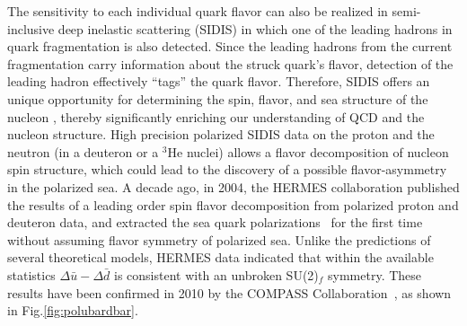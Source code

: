 The sensitivity to each individual quark flavor can also be realized
in semi-inclusive deep inelastic scattering (SIDIS)
in which one of the leading hadrons in quark fragmentation is also detected.
Since the leading hadrons from the current fragmentation 
carry information about
the struck quark's flavor, detection of the leading hadron 
effectively ``tags'' the quark flavor.
Therefore, SIDIS offers an unique opportunity 
for determining the spin, flavor, and sea structure of the nucleon \cite{Frankfurt}, 
thereby significantly enriching 
our understanding of QCD and the nucleon structure. 
High precision polarized SIDIS data on the proton and the neutron 
(in a deuteron or a $^3$He nuclei) allows
a flavor decomposition of nucleon spin structure, which could lead to
the discovery of a possible flavor-asymmetry in the polarized sea.
A decade ago, in 2004, the HERMES collaboration
published the results of a leading order spin flavor decomposition from polarized 
proton and deuteron data, and extracted the sea quark 
polarizations~\cite{Airapetian:2004zf}  for the first time without assuming  flavor symmetry of polarized sea. Unlike 
the predictions of several theoretical models,
HERMES data indicated that within the available statistics
$\Delta \bar{u}- \Delta \bar{d}$ is consistent
with an unbroken SU(2)$_f$ symmetry.  These results have been confirmed in 2010 by the COMPASS Collaboration~\cite{Alekseev:2010ub},   as shown in Fig.\ref{fig:polubardbar}. 

